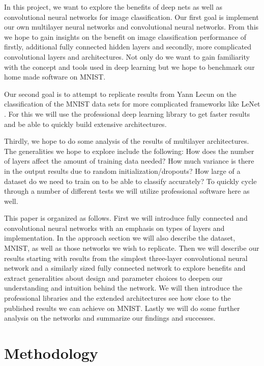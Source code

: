\documentclass[12pt, twocolumn]{article}
\begin{document}
In this project, we want to explore the benefits of deep nets as well as convolutional neural networks for image classification.  Our first goal is implement our own multilayer neural networks and convolutional neural networks. From this we hope to gain insights on the benefit on image classification performance of firstly, additional fully connected hidden layers and secondly, more complicated convolutional layers and architectures.  Not only do we want to gain familiarity with the concept and tools used in deep learning but we hope to benchmark our home made software on MNIST. 

Our second goal is to attempt to replicate results from Yann Lecun on the classification of the MNIST data sets for more complicated frameworks like LeNet \cite{LeCun1998}. For this we will use the professional deep learning library to get faster results and be able to quickly build extensive architectures. 

Thirdly, we hope to do some analysis of the results of multilayer architectures. The generalities we hope to explore include the following: How does the number of layers affect the amount of training data needed?  How much variance is there in the output results due to random initialization/dropouts? How large of a dataset do we need to train on to be able to classify accurately?  To quickly cycle through a number of different tests we will utilize professional software here as well. 

This paper is organized as follows. First we will introduce fully connected and convolutional neural networks with an emphasis on types of layers and implementation. In the approach section we will also describe the dataset, MNIST, as well as those networks we wish to replicate.  Then we will describe our results starting with  results from the simplest three-layer convolutional neural network and a similarly sized fully connected network to explore benefits and extract generalities about design and parameter choices to deepen our understanding and intuition behind the network. We will then introduce the professional libraries and the extended architectures see how close to the published results we can achieve on MNIST. Lastly we will do some further analysis on the networks and summarize our findings and successes.

\section{Methodology}
\end{document}
